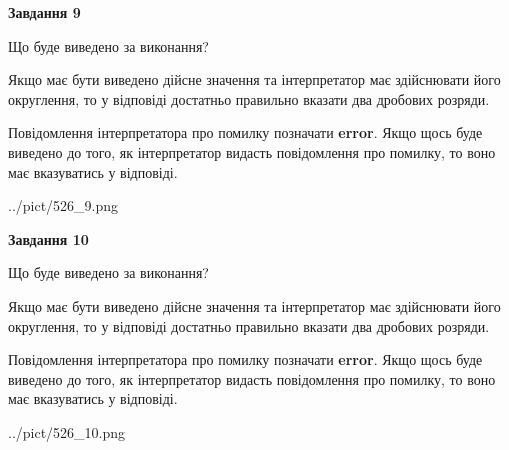 \documentclass[12pt, ukrainian]{article}
\begin{document}
{\begin {Large}
{\begin {center}\textbf{Завдання 9}\end {center}}\par
Що буде виведено за виконання? \par

Якщо має бути виведено дійсне значення та інтерпретатор має здійснювати його округлення, 
то у відповіді достатньо правильно вказати два дробових розряди.

Повідомлення інтерпретатора про помилку позначати \textbf{error}.
Якщо щось буде виведено до того, як інтерпретатор видасть повідомлення про помилку, 
то воно має вказуватись у відповіді. \par

\begin{center}
	{../pict/526_9.png}
\end{center}
\newpage

{\begin {center}\textbf{Завдання 10}\end {center}}\par
Що буде виведено за виконання? \par

Якщо має бути виведено дійсне значення та інтерпретатор має здійснювати його округлення, 
то у відповіді достатньо правильно вказати два дробових розряди.

Повідомлення інтерпретатора про помилку позначати \textbf{error}.
Якщо щось буде виведено до того, як інтерпретатор видасть повідомлення про помилку, 
то воно має вказуватись у відповіді. \par

\begin{center}
	{../pict/526_10.png}
\end{center}
\newpage

\end {Large}}
\end{document}
